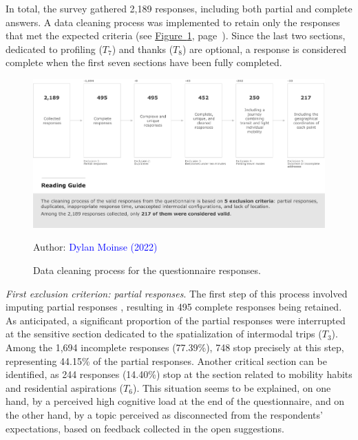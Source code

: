 \begin{refsegment}
In total, the survey gathered 2,189 responses, including both partial and complete answers. A data cleaning process was implemented to retain only the responses that met the expected criteria (see \hyperref[fig-chap3:echantillonnage-questionnaire]{Figure~\ref{fig-chap3:echantillonnage-questionnaire}}, page~\pageref{fig-chap3:echantillonnage-questionnaire}). Since the last two sections, dedicated to profiling (\(T_{7}\)) and thanks (\(T_{8}\)) are optional, a response is considered complete when the first seven sections have been fully completed.%

\begin{figure}[h!]\vspace*{4pt}
    \caption{Data cleaning process for the questionnaire responses.}
    \label{fig-chap3:echantillonnage-questionnaire}
    \centerline{\includegraphics[width=1\columnwidth]{src/Figures/Chap-3/EN_Echantillon_questionnaire.pdf}}
    \vspace{5pt}
    \begin{flushright}\scriptsize{
    Author: \textcolor{blue}{Dylan Moinse (2022)}
    }\end{flushright}
\end{figure}

\textsl{First exclusion criterion: partial responses}. The first step of this process involved imputing partial responses \textcolor{blue}{\autocite[12-13]{armoogum_rapport_2018}}, resulting in 495 complete responses being retained. As anticipated, a significant proportion of the partial responses were interrupted at the sensitive section dedicated to the spatialization of intermodal trips (\(T_{3}\)). Among the 1,694 incomplete responses (77.39\%), 748 stop precisely at this step, representing 44.15\% of the partial responses. Another critical section can be identified, as 244 responses (14.40\%) stop at the section related to mobility habits and residential aspirations (\(T_{6}\)). This situation seems to be explained, on one hand, by a perceived high cognitive load at the end of the questionnaire, and on the other hand, by a topic perceived as disconnected from the respondents' expectations, based on feedback collected in the open suggestions.%


\end{refsegment}
